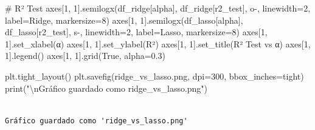 \documentclass[
  doc,
  floatsintext,
  longtable,
  a4paper,
  nolmodern,
  notxfonts,
  notimes,
  12pt,
  colorlinks=true,linkcolor=blue,citecolor=blue,urlcolor=blue]{apa7}
\newenvironment{Shaded}{\begin{snugshade}}{\end{snugshade}}
\newcommand{\BuiltInTok}[1]{\textcolor[rgb]{0.00,0.23,0.31}{#1}}
\newcommand{\CharTok}[1]{\textcolor[rgb]{0.13,0.47,0.30}{#1}}
\newcommand{\CommentTok}[1]{\textcolor[rgb]{0.37,0.37,0.37}{#1}}
\newcommand{\DecValTok}[1]{\textcolor[rgb]{0.68,0.00,0.00}{#1}}
\newcommand{\FloatTok}[1]{\textcolor[rgb]{0.68,0.00,0.00}{#1}}
\newcommand{\NormalTok}[1]{\textcolor[rgb]{0.00,0.23,0.31}{#1}}
\newcommand{\OperatorTok}[1]{\textcolor[rgb]{0.37,0.37,0.37}{#1}}
\newcommand{\StringTok}[1]{\textcolor[rgb]{0.13,0.47,0.30}{#1}}
\newcommand{\VariableTok}[1]{\textcolor[rgb]{0.07,0.07,0.07}{#1}}
\begin{document}
\begin{Shaded}
\begin{Highlighting}[]
\CommentTok{\# R² Test}
\NormalTok{axes[}\DecValTok{1}\NormalTok{, }\DecValTok{1}\NormalTok{].semilogx(df\_ridge[}\StringTok{\textquotesingle{}alpha\textquotesingle{}}\NormalTok{], df\_ridge[}\StringTok{\textquotesingle{}r2\_test\textquotesingle{}}\NormalTok{], }
                    \StringTok{\textquotesingle{}o{-}\textquotesingle{}}\NormalTok{, linewidth}\OperatorTok{=}\DecValTok{2}\NormalTok{, label}\OperatorTok{=}\StringTok{\textquotesingle{}Ridge\textquotesingle{}}\NormalTok{, markersize}\OperatorTok{=}\DecValTok{8}\NormalTok{)}
\NormalTok{axes[}\DecValTok{1}\NormalTok{, }\DecValTok{1}\NormalTok{].semilogx(df\_lasso[}\StringTok{\textquotesingle{}alpha\textquotesingle{}}\NormalTok{], df\_lasso[}\StringTok{\textquotesingle{}r2\_test\textquotesingle{}}\NormalTok{], }
                    \StringTok{\textquotesingle{}s{-}\textquotesingle{}}\NormalTok{, linewidth}\OperatorTok{=}\DecValTok{2}\NormalTok{, label}\OperatorTok{=}\StringTok{\textquotesingle{}Lasso\textquotesingle{}}\NormalTok{, markersize}\OperatorTok{=}\DecValTok{8}\NormalTok{)}
\NormalTok{axes[}\DecValTok{1}\NormalTok{, }\DecValTok{1}\NormalTok{].set\_xlabel(}\StringTok{\textquotesingle{}α\textquotesingle{}}\NormalTok{)}
\NormalTok{axes[}\DecValTok{1}\NormalTok{, }\DecValTok{1}\NormalTok{].set\_ylabel(}\StringTok{\textquotesingle{}R²\textquotesingle{}}\NormalTok{)}
\NormalTok{axes[}\DecValTok{1}\NormalTok{, }\DecValTok{1}\NormalTok{].set\_title(}\StringTok{\textquotesingle{}R² Test vs α\textquotesingle{}}\NormalTok{)}
\NormalTok{axes[}\DecValTok{1}\NormalTok{, }\DecValTok{1}\NormalTok{].legend()}
\NormalTok{axes[}\DecValTok{1}\NormalTok{, }\DecValTok{1}\NormalTok{].grid(}\VariableTok{True}\NormalTok{, alpha}\OperatorTok{=}\FloatTok{0.3}\NormalTok{)}

\NormalTok{plt.tight\_layout()}
\NormalTok{plt.savefig(}\StringTok{\textquotesingle{}ridge\_vs\_lasso.png\textquotesingle{}}\NormalTok{, dpi}\OperatorTok{=}\DecValTok{300}\NormalTok{, bbox\_inches}\OperatorTok{=}\StringTok{\textquotesingle{}tight\textquotesingle{}}\NormalTok{)}
\BuiltInTok{print}\NormalTok{(}\StringTok{"}\CharTok{\textbackslash{}n}\StringTok{Gráfico guardado como \textquotesingle{}ridge\_vs\_lasso.png\textquotesingle{}"}\NormalTok{)}
\end{Highlighting}
\end{Shaded}

\begin{verbatim}

Gráfico guardado como 'ridge_vs_lasso.png'
\end{verbatim}
\end{document}
